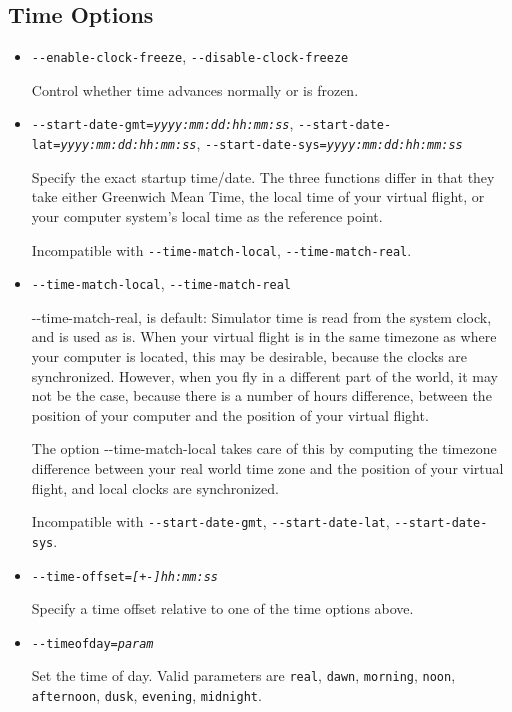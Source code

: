 {
  \subsection{Time Options}
  \begin{itemize}

  \item{\texttt{-$ $-enable-clock-freeze}, \texttt{-$ $-disable-clock-freeze}}

  Control whether time advances normally or is frozen.

  \item{\texttt{-$ $-start-date-gmt={\it yyyy:mm:dd:hh:mm:ss}},
  \texttt{-$ $-start-date-lat={\it yyyy:mm:dd:hh:mm:ss}},
  \texttt{-$ $-start-date-sys={\it yyyy:mm:dd:hh:mm:ss}}}

  Specify the exact startup time/date. The three functions differ in that they
  take either Greenwich Mean Time, the local time of your virtual flight, or
  your computer system's local time as the reference point.

  Incompatible with \texttt{-$ $-time-match-local}, \texttt{-$ $-time-match-real}.

  \item{\texttt{-$ $-time-match-local}, \texttt{-$ $-time-match-real}}

  {-$ $-time-match-real}, is default: Simulator time is read from the system clock, and
  is used as is. When your virtual flight is in the same timezone as where your computer
  is located, this may be desirable, because the clocks are synchronized. However,
  when you fly in a different part of the world, it may not be the case, because there
  is a number of hours difference, between the position of your computer and the position of your
  virtual flight.

  The option {-$ $-time-match-local} takes care of this by computing the timezone
  difference between your real world time zone and the position of your virtual
  flight, and local clocks are synchronized.

  Incompatible with \texttt{-$ $-start-date-gmt}, \texttt{-$ $-start-date-lat}, \texttt{-$ $-start-date-sys}.

  \item{\texttt{-$ $-time-offset={\it [+-]hh:mm:ss}}}

  Specify a time offset relative to one of the time options above.

  \item{\texttt{-$ $-timeofday={\it param}}}

  Set the time of day. Valid parameters are \texttt{real}, \texttt{dawn}, \texttt{morning},
  \texttt{noon}, \texttt{afternoon}, \texttt{dusk}, \texttt{evening}, \texttt{midnight}.

  \end{itemize}
}
\fi


